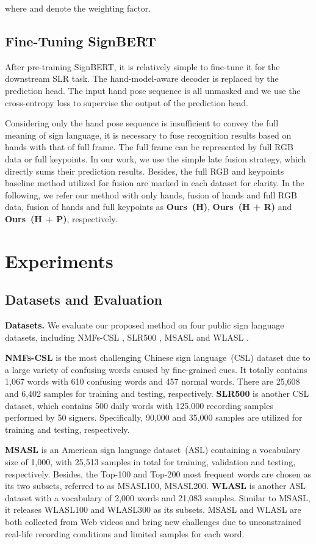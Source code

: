\documentclass[10pt,twocolumn,letterpaper]{article}
\begin{document}
where  and  denote the weighting factor.


\subsection{Fine-Tuning SignBERT}
After pre-training SignBERT, it is relatively simple to fine-tune it for the downstream SLR task.
The hand-model-aware decoder is replaced by the prediction head.
The input hand pose sequence is all unmasked and we use the cross-entropy loss to supervise the output of the prediction head.

Considering only the hand pose sequence is insufficient to convey the full meaning of sign language, it is necessary to fuse recognition results based on hands with that of full frame.
The full frame can be represented by full RGB data or full keypoints. 
In our work, we use the simple late fusion strategy, which directly sums their prediction results.
Besides, the full RGB and keypoints baseline method utilized for fusion are marked in each dataset for clarity.
In the following, we refer our method with only hands, fusion of hands and full RGB data, fusion of hands and full keypoints as \textbf{Ours~(H)}, \textbf{Ours~(H + R)} and \textbf{Ours~(H + P)}, respectively.


\section{Experiments}
\subsection{Datasets and Evaluation}
\noindent
\textbf{Datasets.} 
We evaluate our proposed method on four public sign language datasets, including NMFs-CSL \cite{hu2020global}, SLR500 \cite{huang2018attention}, MSASL \cite{joze2018ms} and WLASL \cite{li2020word}. 

\textbf{NMFs-CSL} is the most challenging Chinese sign language~(CSL) dataset due to a large variety of confusing words caused by fine-grained cues. 
It totally contains 1,067 words with 610 confusing words and 457 normal words. 
There are 25,608 and 6,402 samples for training and testing, respectively.
\textbf{SLR500} is another CSL dataset, which contains 500 daily words with 125,000 recording samples performed by 50 signers. 
Specifically, 90,000 and 35,000 samples are utilized for training and testing, respectively.

\textbf{MSASL} is an American sign language dataset~(ASL) containing a vocabulary size of 1,000, with 25,513 samples in total for training, validation and testing, respectively. 
Besides, the Top-100 and Top-200 most frequent words are chosen as its two subsets, referred to as MSASL100, MSASL200.
\textbf{WLASL} is another ASL dataset with a vocabulary of 2,000 words and 21,083 samples.
Similar to MSASL, it releases WLASL100 and WLASL300 as its subsets.
MSASL and WLASL are both collected from Web videos and bring new challenges due to unconstrained real-life recording conditions and limited samples for each word.
\end{document}
